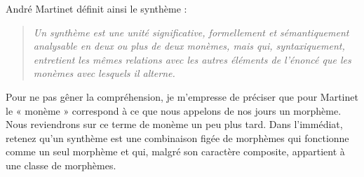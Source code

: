 André Martinet définit ainsi le synthème :
\begin{quote}\small\itshape
Un synthème est une unité significative, formellement et sémantiquement analysable en deux ou plus de deux monèmes, mais qui, syntaxiquement, entretient les mêmes relations avec les autres éléments de l’énoncé que les monèmes avec lesquels il alterne.
\end{quote}
Pour ne pas gêner la compréhension, je m’empresse de préciser que pour Martinet le « monème » correspond à ce que nous appelons de nos jours un morphème. Nous reviendrons sur ce terme de monème un peu plus tard. Dans l’immédiat, retenez qu’un synthème est une combinaison figée de morphèmes qui fonctionne comme un seul morphème et qui, malgré son caractère composite, appartient à une classe de morphèmes.

